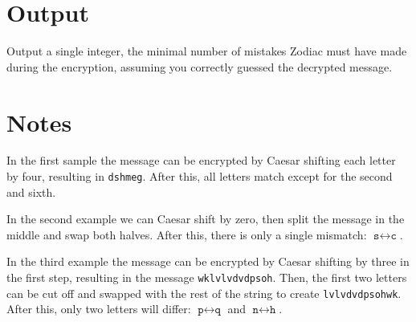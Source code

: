 \section*{Output}
Output a single integer, the minimal number of mistakes Zodiac must have made during the encryption,
assuming you correctly guessed the decrypted message.

\section*{Notes}
In the first sample the message can be encrypted by Caesar shifting each letter by four,
resulting in \texttt{dshmeg}.
After this, all letters match except for the second and sixth.

In the second example we can Caesar shift by zero, then split the message in the middle and swap both halves.
After this, there is only a single mismatch: $\texttt{s}\leftrightarrow{}\texttt{c}$.

In the third example the message can be encrypted by Caesar shifting by three in the first step,
resulting in the message \texttt{wklvlvdvdpsoh}.
Then, the first two letters can be cut off and swapped with the rest of the string to create \texttt{lvlvdvdpsohwk}.
After this, only two letters will differ: $\texttt{p}\leftrightarrow{}\texttt{q}$ and $\texttt{n}\leftrightarrow{}\texttt{h}$.

